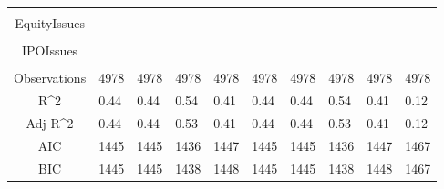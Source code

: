 \documentclass{article}
\begin{document}
\begin{table}[H]
\begin{tabular}{|clllllllll|}
   &  &  &  &  &  &  &  &  &  \\ 
  EquityIssues &  &  &  &  &  &  &  &  &  \\ 
   &  &  &  &  &  &  &  &  &  \\ 
  IPOIssues &  &  &  &  &  &  &  &  &  \\ 
   &  &  &  &  &  &  &  &  &  \\ 
  \hline 
 Observations & 4978 & 4978 & 4978 & 4978 & 4978 & 4978 & 4978 & 4978 & 4978 \\ 
  R^2 & 0.44 & 0.44 & 0.54 & 0.41 & 0.44 & 0.44 & 0.54 & 0.41 & 0.12 \\ 
  Adj R^2 & 0.44 & 0.44 & 0.53 & 0.41 & 0.44 & 0.44 & 0.53 & 0.41 & 0.12 \\ 
  AIC & 1445 & 1445 & 1436 & 1447 & 1445 & 1445 & 1436 & 1447 & 1467 \\ 
  BIC & 1445 & 1445 & 1438 & 1448 & 1445 & 1445 & 1438 & 1448 & 1467 \\ 
   \hline
\end{tabular}
 
\end{table}
\end{document}
